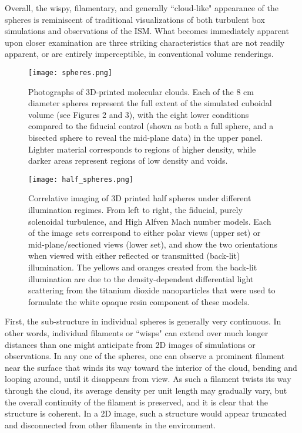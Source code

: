 \documentclass[twocolumn]{aastex63}
\begin{document}
Overall, the wispy, filamentary, and generally ``cloud-like" appearance of the spheres is reminiscent of traditional visualizations of both turbulent box simulations and observations of the ISM.  What becomes immediately apparent upon closer examination are three striking characteristics that are not readily apparent, or are entirely imperceptible, in conventional volume renderings. 

\begin{figure*}[ht!]
    \centering
    \texttt{[image: spheres.png]}
    \caption{Photographs of 3D-printed molecular clouds.  Each of the 8 cm diameter spheres represent the full extent of the simulated cuboidal volume (see Figures 2 and 3), with the eight lower conditions compared to the fiducial control (shown as both a full sphere, and a bisected sphere to reveal the mid-plane data) in the upper panel.  Lighter material corresponds to regions of higher density, while darker areas represent regions of low density and voids.}
    \label{fig:spheres}
\end{figure*}



\begin{figure*}
\centering
 \texttt{[image: half\_spheres.png]}
    \caption{Correlative imaging of 3D printed half spheres under different illumination regimes.  From left to right, the fiducial, purely solenoidal turbulence, and High Alfven Mach number models.  Each of the image sets correspond to either polar views (upper set) or mid-plane/sectioned views (lower set), and show the two orientations when viewed with either reflected or transmitted (back-lit) illumination.  The yellows and oranges created from the back-lit illumination are due to the density-dependent differential light scattering from the titanium dioxide nanoparticles that were used to formulate the white opaque resin component of these models.}
    \label{fig:half_spheres}
\end{figure*}


First, the sub-structure in individual spheres is generally very continuous.  In other words, individual filaments or ``wisps" can extend over much longer distances than one might anticipate from 2D images of simulations or observations.  In any one of the spheres, one can observe a prominent filament near the surface that winds its way toward the interior of the cloud, bending and looping around, until it disappears from view.  As such a filament twists its way through the cloud, its average density per unit length may gradually vary, but the overall continuity of the filament is preserved, and it is clear that the structure is coherent.  In a 2D image, such a structure would appear truncated and disconnected from other filaments in the environment.
\end{document}
